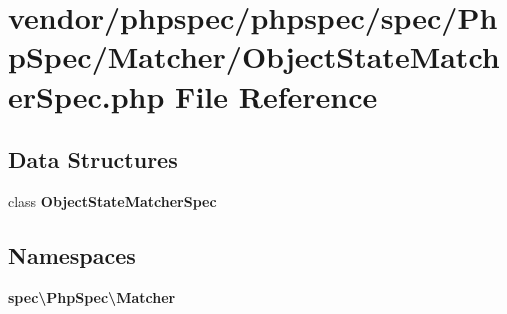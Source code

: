 \section{vendor/phpspec/phpspec/spec/\+Php\+Spec/\+Matcher/\+Object\+State\+Matcher\+Spec.php File Reference}
\label{_object_state_matcher_spec_8php}
\subsection*{Data Structures}
\begin{DoxyCompactItemize}
\item 
class {\bf Object\+State\+Matcher\+Spec}
\end{DoxyCompactItemize}
\subsection*{Namespaces}
\begin{DoxyCompactItemize}
\item 
 {\bf spec\textbackslash{}\+Php\+Spec\textbackslash{}\+Matcher}
\end{DoxyCompactItemize}
